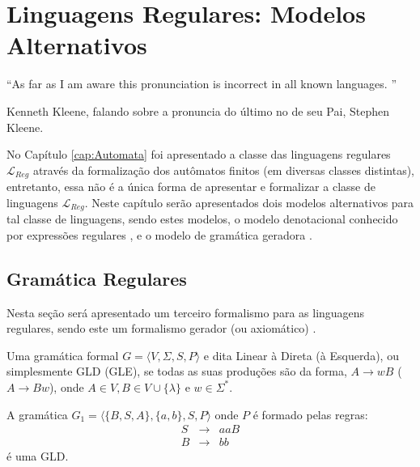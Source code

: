 \chapter{Linguagens Regulares: Modelos Alternativos}\label{cap:ExpressionsGrammars}

\epigraph{``As far as I am aware this pronunciation is incorrect in all known languages. ''}{Kenneth Kleene, falando sobre a pronuncia do último no de seu Pai, Stephen Kleene.}

No Capítulo \ref{cap:Automata} foi apresentado a classe das linguagens regulares $\mathcal{L}_{Reg}$ através da formalização dos autômatos finitos (em diversas classes distintas), entretanto, essa não é a única forma de apresentar e formalizar a classe de linguagens $\mathcal{L}_{Reg}$.  Neste capítulo serão apresentados dois modelos alternativos para tal classe de linguagens, sendo estes modelos, o modelo denotacional conhecido por expressões regulares \cite{menezes1998LFA}, e o modelo de gramática geradora \cite{chomsky1956}.

\section{Gramática Regulares}\label{sec:GramaticaRegular}

Nesta seção será apresentado um terceiro formalismo para as linguagens regulares, sendo este um formalismo gerador (ou axiomático) \cite{menezes1998LFA}. 

\begin{definicao}\label{def:GramaticaLinear}
	Uma gramática formal $G = \langle V, \Sigma, S, P \rangle$ e dita Linear à Direta (à Esquerda), ou simplesmente GLD (GLE), se todas as suas produções são da forma, $A \rightarrow wB$ ($A \rightarrow Bw$), onde $A \in V, B \in V \cup \{\lambda\}$ e $w \in \Sigma^*$.
\end{definicao}

\begin{exemplo}
	A gramática $G_1 = \langle \{B, S , A\}, \{a, b\}, S, P \rangle$ onde $P$ é formado pelas regras:
	\begin{eqnarray*}
		S & \rightarrow& aaB\\
		B & \rightarrow& bb
	\end{eqnarray*}
	é uma GLD.
\end{exemplo}

